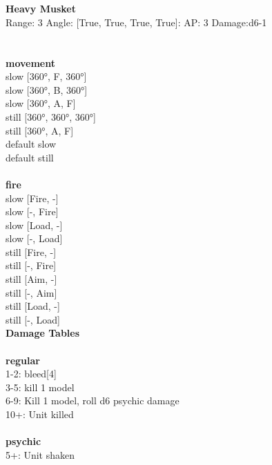 \ \\

\ \\
{\bf Heavy Musket } \\



Range: 3  Angle: [True, True, True, True]: AP: 3 Damage:d6-1 \\




 
\ \\



\ \\ {\bf movement } \\
slow [360°, F, 360°] \\
slow [360°, B, 360°] \\
slow [360°, A, F] \\
still [360°, 360°, 360°] \\
still [360°, A, F] \\
default slow \\
default still \\
\ \\ {\bf fire } \\
slow [Fire, -] \\
slow [-, Fire] \\
slow [Load, -] \\
slow [-, Load] \\
still [Fire, -] \\
still [-, Fire] \\
still [Aim, -] \\
still [-, Aim] \\
still [Load, -] \\
still [-, Load] \\


{\bf Damage Tables} \\
\ \\ {\bf regular } \\
1-2: bleed[4] \\
3-5: kill 1 model \\
6-9: Kill 1 model, roll d6 psychic damage \\
10+: Unit killed \\
\ \\ {\bf psychic } \\
5+: Unit shaken \\










